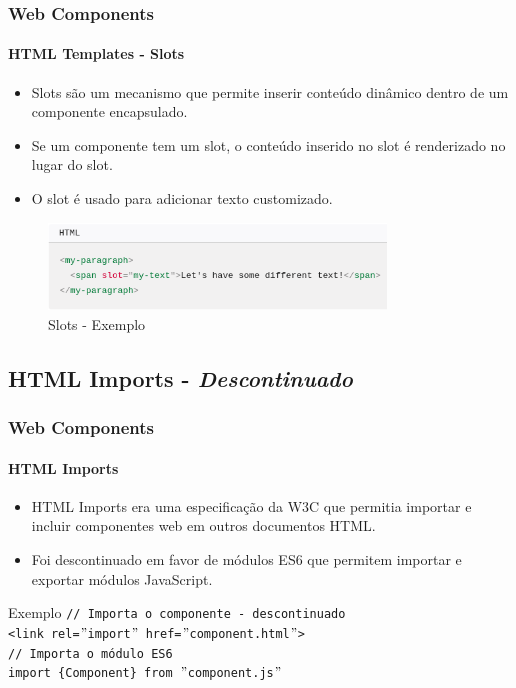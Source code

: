 \documentclass[
	9pt, %
	t, %
]{beamer}
\begin{document}
\begin{frame}
	\frametitle{Web Components}
	\framesubtitle{HTML Templates - Slots}
	\begin{itemize}
		\item Slots são um mecanismo que permite inserir conteúdo dinâmico dentro de um componente encapsulado.
		\item Se um componente tem um slot, o conteúdo inserido no slot é renderizado no lugar do slot.
		\item O slot é usado para adicionar texto customizado.
	\end{itemize}

	\begin{figure}
		\centering
		\includegraphics[width=0.8\textwidth]{html_slots.png}
		\caption{Slots - Exemplo}
	\end{figure}

\end{frame}

\subsection{HTML Imports - \textit{Descontinuado}}

\begin{frame}
	\frametitle{Web Components}
	\framesubtitle{HTML Imports}
	\begin{itemize}
		\item HTML Imports era uma especificação da W3C que permitia importar e incluir componentes web em outros documentos HTML.
		\item Foi descontinuado em favor de módulos ES6 que permitem importar e exportar módulos JavaScript.
	\end{itemize}

	\begin{block}{Exemplo}
		\texttt{// Importa o componente - \alert{descontinuado}}\\
		\texttt{<link rel=$"$import$"$ href=$"$component.html$"$>}\\

		\bigskip 
		\texttt{// Importa o módulo ES6}\\
		\texttt{import \{Component\} from $"$component.js$"$}
	\end{block}

\end{frame}
\end{document}
